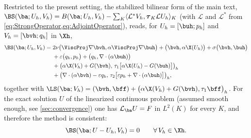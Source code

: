 Restricted to the present setting, the stabilized bilinear form of the main text,
$\BS(\ba; U_h,V_h)=B(\ba; U_h,V_h)-\sum_K \langle \mathcal{L}^* V_h,
\boldsymbol{\tau}_K \mathcal{L} U_h\rangle_K$ (with $\mathcal{L}$ and $\mathcal{L}^*$ from
\cref{eq:StrongOperator,eq:AdjointOperator}), reads, for
$U_h=[\buh;p_h]$ and $V_h=[\bvh;q_h]$ in $\Xh$,
\begin{equation}\label{eq:Bstab}
\begin{aligned}
  \BS(\ba; U_h,V_h)
  ={}& 2\nu\bigl(\ViscProj\nabla\bvh,\alpha\ViscProj\nabla\buh\bigr)
     + \bigl(\bvh,\alpha\X(U_h)\bigr)
     + \sigma\bigl(\bvh,\buh\bigr) \\
   & + \varepsilon\bigl(q_h,p_h\bigr)
     + \bigl(q_h,\nabla\cdot(\alpha\buh)\bigr) \\
   & + \bigl(\alpha\X(V_h)+G(\bvh),\,
       \tau_1\bigl[\alpha\X(U_h)-G(\buh)\bigr]\bigr)_h \\
   & + \bigl(\nabla\cdot(\alpha\bvh)-\varepsilon q_h,\,
       \tau_2\bigl[\varepsilon p_h+\nabla\cdot(\alpha\buh)\bigr]\bigr)_h ,
\end{aligned}
\end{equation}
together with
$\LS(\ba;V_h)=(\bvh,\bff)
 +\bigl(\alpha\X(V_h)+G(\bvh),\tau_1\bff\bigr)_h$.
For the exact solution $U$ of the linearized continuous problem (assumed smooth enough,
see \cref{sec:convergence}) one has $\mathcal{L}_{\ba}U=F$ in $L^2(K)$ for every $K$, and
therefore the method is consistent:
\begin{equation}\label{eq:consistency}
  \BS(\ba; U-U_h, V_h) = 0 \qquad \forall\, V_h\in\Xh .
\end{equation}

